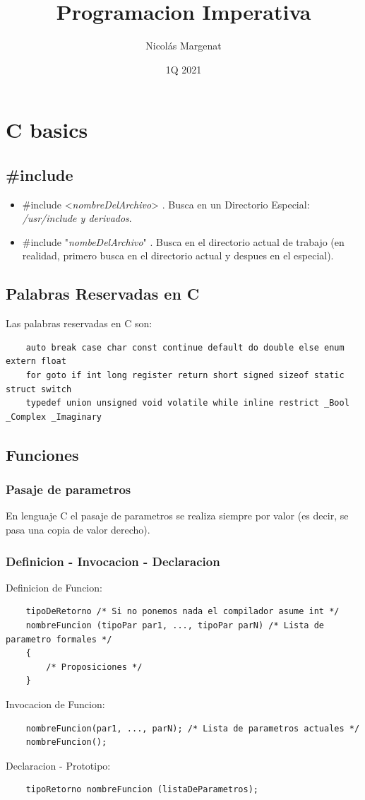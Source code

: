 \documentclass{article}
\title{Programacion Imperativa}
\author{Nicolás Margenat}
\date{1Q 2021}
\begin{document}
\maketitle
\tableofcontents

\newpage
\section{C basics}
\subsection{\#include}
\begin{itemize}
	\item \#include <\emph{nombreDelArchivo}> . Busca en un Directorio Especial: \emph{/usr/include y derivados}.
	\item \#include "\emph{nombeDelArchivo}" . Busca en el directorio actual de trabajo (en realidad, primero busca en el directorio actual y despues en el especial).
\end{itemize}

\subsection{Palabras Reservadas en C}
Las palabras reservadas en C son: 
\begin{verbatim}
    auto break case char const continue default do double else enum extern float
    for goto if int long register return short signed sizeof static struct switch
    typedef union unsigned void volatile while inline restrict _Bool _Complex _Imaginary
\end{verbatim}

\subsection{Funciones}
\subsubsection*{Pasaje de parametros}
En lenguaje C el pasaje de parametros se realiza siempre por valor (es decir, se pasa una copia de valor derecho).
\subsubsection*{Definicion - Invocacion - Declaracion}
Definicion de Funcion:
\begin{lstlisting}
    tipoDeRetorno /* Si no ponemos nada el compilador asume int */
    nombreFuncion (tipoPar par1, ..., tipoPar parN) /* Lista de parametro formales */
    {
        /* Proposiciones */
    }
\end{lstlisting}
Invocacion de Funcion:
\begin{lstlisting}
    nombreFuncion(par1, ..., parN); /* Lista de parametros actuales */
    nombreFuncion();
\end{lstlisting}
Declaracion - Prototipo:
\begin{lstlisting}
    tipoRetorno nombreFuncion (listaDeParametros);
\end{lstlisting}
\end{document}
